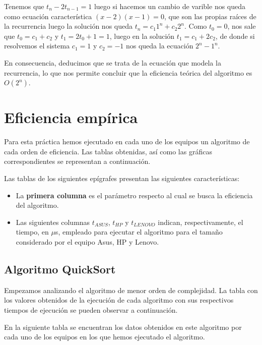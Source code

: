 \documentclass{homework}
\begin{document}
    Tenemos que $t_n - 2t_{n-1} = 1 $ luego si hacemos un cambio de varible nos queda como ecuación característica $(x-2)(x-1) = 0$, que son las propias raíces de la 
    recurrencia luego la solución nos queda $t_n = c_1 1^n  + c_2 2^n  $. Como $t_0=0$, nos sale que $t_0 = c_1 + c_2$ y $t_1 = 2 t_0 + 1 = 1$, luego en la 
    solución $t_1=c_1 + 2 c_2 $, de donde si resolvemos el sistema $c_1 = 1$ y $c_2 = -1$ nos queda la ecuación $2^n - 1^n$. 
    
    En consecuencia, deducimos que se trata de la ecuación que 
    modela la recurrencia, lo que nos permite concluir que la eficiencia teórica del algoritmo es $O(2^n)$.

    \section{Eficiencia empírica}

    Para esta práctica hemos ejecutado en cada uno de los equipos un algoritmo de cada orden de eficiencia.
    Las tablas obtenidas, así como las gráficas correspondientes se representan a continuación.

    Las tablas de los siguientes epígrafes presentan las siguientes características:

    \begin{itemize}
        \item La \textbf{primera columna} es el parámetro respecto al cual se busca la eficiencia del algoritmo.
        \item Las siguientes columnas $t_{ASUS}$, $t_{HP}$ y $t_{LENOVO}$ indican, respectivamente, el tiempo, en $\mu$s, empleado para ejecutar el algoritmo para el 
        tamaño considerado por el equipo Asus, HP y Lenovo.
    \end{itemize}

    \newpage

    \subsection{Algoritmo QuickSort}

    Empezamos analizando el algoritmo de menor orden de complejidad. La tabla con los valores obtenidos de la ejecución
    de cada algoritmo con sus respectivos tiempos de ejecución se pueden observar a continuación.

    En la siguiente tabla se encuentran los datos obtenidos en este algoritmo por cada uno de los
    equipos en los que hemos ejecutado el algoritmo. 
\end{document}
